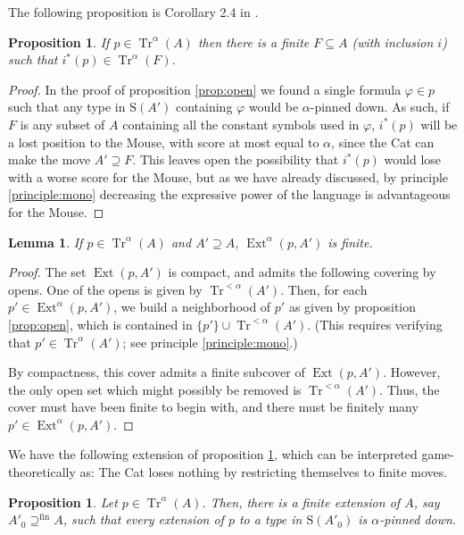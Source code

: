 \documentclass{article}
\newtheorem{prop}[theorem]{Proposition}
\newtheorem{lemma}[theorem]{Lemma}
\theoremstyle{nonumberplain}
\newtheorem{proof}{Proof}
\newcommand{\Stone}{\mathrm{S}}
\DeclareMathOperator{\Tr}{Tr}
\DeclareMathOperator{\Ext}{Ext}
\begin{document}
The following proposition is Corollary 2.4 in \cite{morley}.

\begin{prop}\label{prop:f}
If $p \in \Tr^\alpha(A)$ then there is a finite $F \subseteq A$ (with inclusion $i$) such that $i^*(p) \in \Tr^\alpha(F)$.
\end{prop}

\begin{proof}
In the proof of proposition \ref{prop:open} we found a single formula $\varphi \in p$ such that any type in $\Stone(A')$ containing $\varphi$ would be $\alpha$-pinned down. As such, if $F$ is any subset of $A$ containing all the constant symbols used in $\varphi$, $i^*(p)$ will be a lost position to the Mouse, with score at most equal to $\alpha$, since the Cat can make the move $A' \supseteq F$. This leaves open the possibility that $i^*(p)$ would lose with a worse score for the Mouse, but as we have already discussed, by principle \ref{principle:mono} decreasing the expressive power of the language is advantageous for the Mouse.
\end{proof}

\begin{lemma}\label{lemma:deg}
If $p \in \Tr^\alpha(A)$ and $A' \supseteq A$, $\Ext^\alpha(p, A')$ is finite.
\end{lemma}

\begin{proof}
The set $\Ext(p,A')$ is compact, and admits the following covering by opens. One of the opens is given by $\Tr^{<\alpha}(A')$. Then, for each $p' \in \Ext^\alpha(p,A')$, we build a neighborhood of $p'$ as given by proposition \ref{prop:open}, which is contained in $\{p'\} \cup \Tr^{<\alpha}(A')$. (This requires verifying that $p' \in \Tr^\alpha(A')$; see principle \ref{principle:mono}.)

By compactness, this cover admits a finite subcover of $\Ext(p,A')$. However, the only open set which might possibly be removed is $\Tr^{<\alpha}(A')$. Thus, the cover must have been finite to begin with, and there must be finitely many $p' \in \Ext^\alpha(p,A')$.
\end{proof}

We have the following extension of proposition \ref{prop:f}, which can be interpreted game-theoretically as: The Cat loses nothing by restricting themselves to finite moves.

\begin{prop}
Let $p \in \Tr^\alpha(A)$. Then, there is a \emph{finite} extension of $A$, say $A'_0 \supseteq^{\text{fin}} A$, such that every extension of $p$ to a type in $\Stone(A'_0)$ is $\alpha$-pinned down.
\end{prop}
\end{document}
